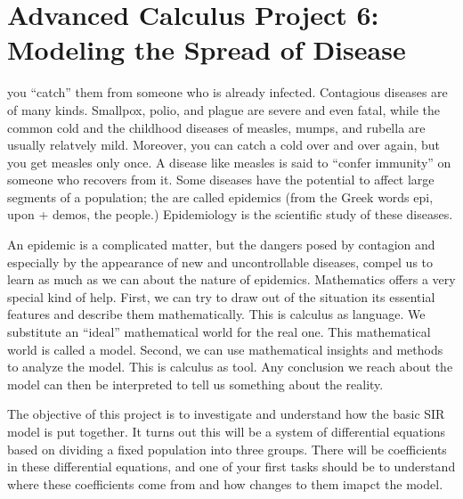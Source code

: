 \documentclass
[justified,nohyper]
{tufte-handout}
\begin{document}
\section{Advanced Calculus Project 6: Modeling the Spread of Disease}

 you ``catch'' them from someone 
who is already infected. Contagious diseases are of many kinds. Smallpox, polio, 
and plague are severe and even fatal, while the common cold and the childhood 
diseases of measles, mumps, and rubella are usually relatvely mild. Moreover, you 
can catch a cold over and over again, but you get measles only once. A disease 
like measles is said to ``confer immunity'' on someone who recovers from it. Some 
diseases have the potential to affect large segments of a population; the are 
called epidemics (from the Greek words epi, upon + demos, the people.) 
Epidemiology is the scientific study of these diseases.

An epidemic is a complicated matter, but the dangers posed by contagion and 
especially by the appearance of new and uncontrollable diseases, compel us to 
learn as much as we can about the nature of epidemics. Mathematics offers a very 
special kind of help. First, we can try to draw out of the situation its 
essential features and describe them mathematically. This is calculus as 
language. We substitute an ``ideal'' mathematical world for the real one. This 
mathematical world is called a model. Second, we can use mathematical insights 
and methods to analyze the model. This is calculus as tool. Any conclusion we 
reach about the model can then be interpreted to tell us something about the 
reality.

The objective of this project is to investigate and understand how the basic SIR 
model is put together. It turns out this will be a system of differential 
equations based on dividing a fixed population into three groups. There will be 
coefficients in these differential equations, and one of your first tasks should 
be to understand where these coefficients come from and how changes to them 
imapct the model.

\end{document}
